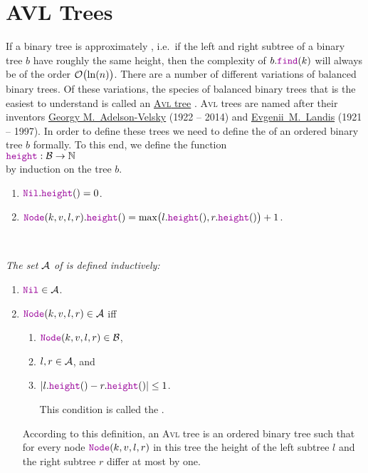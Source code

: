 \section{AVL Trees}
If a binary tree is approximately , i.e.~if the left and right subtree of a binary tree $b$  have
roughly the same height, then the complexity of $b.\mytt{find}(k)$ will always be of the order
$\mathcal{O}\bigl(\ln(n)\bigr)$.  There are a number of different variations of
balanced binary trees.  Of these variations, the species of balanced binary trees that is the easiest to understand is
called an \href{https://en.wikipedia.org/wiki/Avl_tree}{\textsc{Avl} tree} \cite{adelson:62}.  \textsc{Avl} trees are 
named after their inventors \href{https://en.wikipedia.org/wiki/Georgy_Adelson-Velsky}{Georgy M.~Adelson-Velsky}
(1922 -- 2014) and \href{https://en.wikipedia.org/wiki/Evgenii_Landis}{Evgenii~M.~Landis} (1921 -- 1997).
In order to define these trees we need to define the  of an ordered binary tree $b$ formally.  To this
end, we define the function
\\[0.2cm]
\hspace*{1.3cm}
$\mytt{height}: \mathcal{B} \rightarrow \mathbb{N}$
\\[0.2cm]
by induction on the tree $b$.
\begin{enumerate}
\item $\mytt{Nil}.\mytt{height}() = 0$.
\item $\mytt{Node}(k,v,l,r).\mytt{height}() = 
       \max\bigl( l.\mytt{height}(), r.\mytt{height}() \bigr) + 1$. 
\end{enumerate}

\begin{Definition} \hspace*{\fill} \\
{\em 
  The set $\mathcal{A}$ of   is defined inductively:
  \begin{enumerate}
  \item $\mytt{Nil} \in \AVL$.
  \item $\mytt{Node}(k,v,l,r) \in \AVL$ \quad iff 
        \begin{enumerate}
        \item $\mytt{Node}(k,v,l,r) \in \Bin$,
        \item $l, r \in \mathcal{A}$, \quad and
        \item $|l.\mytt{height}() - r.\mytt{height}()| \leq 1$.

              This condition is called the . 
        \end{enumerate}
        According to this definition, an \textsc{Avl} tree is an ordered binary tree such that for every node
        $\mytt{Node}(k,v,l,r)$ in this tree the height of the left subtree $l$ and the right
        subtree  $r$ differ at most by one.  \eox
  \end{enumerate}
}  
\end{Definition}


